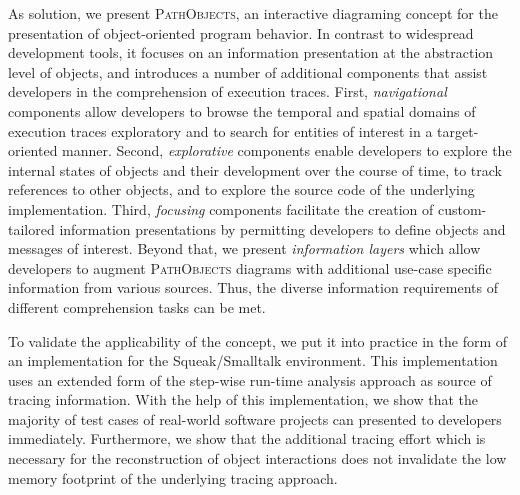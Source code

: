 As solution, we present \textsc{PathObjects}, an interactive diagraming concept for the presentation of object-oriented program behavior.
In contrast to widespread development tools, it focuses on an information presentation at the abstraction level of objects, and introduces a number of additional components that assist developers in the comprehension of execution traces.
First, \textit{navigational} components allow developers to browse the temporal and spatial domains of execution traces exploratory and to search for entities of interest in a target-oriented manner.
Second, \textit{explorative} components enable developers to explore the internal states of objects and their development over the course of time, to track references to other objects, and to explore the source code of the underlying implementation.
Third, \textit{focusing} components facilitate the creation of custom-tailored information presentations by permitting developers to define objects and messages of interest.
Beyond that, we present \textit{information layers} which allow developers to augment \textsc{PathObjects} diagrams with additional use-case specific information from various sources.
Thus, the diverse information requirements of different comprehension tasks can be met.

To validate the applicability of the concept, we put it into practice in the form of an implementation for the Squeak/Smalltalk environment.
This implementation uses an extended form of the step-wise run-time analysis approach as source of tracing information.
With the help of this implementation, we show that the majority of test cases of real-world software projects can presented to developers immediately.
Furthermore, we show that the additional tracing effort which is necessary for the reconstruction of object interactions does not invalidate the low memory footprint of the underlying tracing approach.


